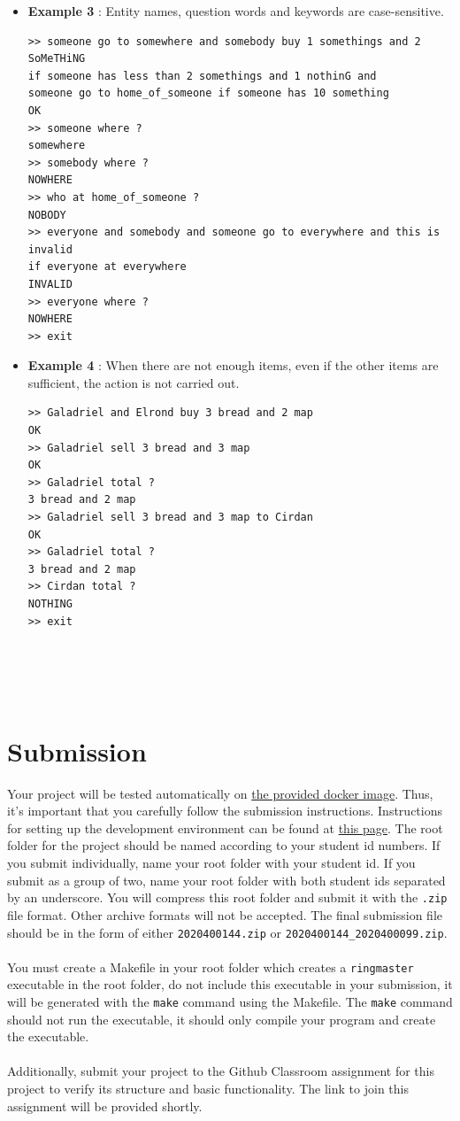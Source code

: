 \documentclass[12pt]{article}
\begin{document}
\begin{itemize}
\item \textbf{Example 3} : Entity names, question words and keywords are case-sensitive.{
\begin{verbatim}
>> someone go to somewhere and somebody buy 1 somethings and 2 SoMeTHiNG 
if someone has less than 2 somethings and 1 nothinG and 
someone go to home_of_someone if someone has 10 something
OK
>> someone where ?
somewhere
>> somebody where ?
NOWHERE
>> who at home_of_someone ?
NOBODY
>> everyone and somebody and someone go to everywhere and this is invalid 
if everyone at everywhere
INVALID
>> everyone where ?
NOWHERE
>> exit
\end{verbatim}}

\item \textbf{Example 4} : When there are not enough items, even if the other items are sufficient, the action is not carried out.{
\begin{verbatim}
>> Galadriel and Elrond buy 3 bread and 2 map
OK
>> Galadriel sell 3 bread and 3 map
OK
>> Galadriel total ?
3 bread and 2 map
>> Galadriel sell 3 bread and 3 map to Cirdan
OK
>> Galadriel total ?
3 bread and 2 map
>> Cirdan total ?
NOTHING
>> exit





\end{verbatim}}
\end{itemize}

\section{Submission}

Your project will be tested automatically on \href{https://hub.docker.com/repository/docker/gokceuludogan/cmpe230_spring24}{the provided docker image}. Thus, it's important that you carefully follow the submission instructions. Instructions for setting up the development environment can be found at \href{https://github.com/bouncmpe230/docker-starter-course/}{this page}. The root folder for the project should be named according to your student id numbers. If you submit individually, name your root folder with your student id. If you submit as a group of two, name your root folder with both student ids separated by an underscore. You will compress this root folder and submit it with the \texttt{.zip} file format. Other archive formats will not be accepted. The final submission file should be in the form of either \texttt{2020400144.zip} or \texttt{2020400144\_2020400099.zip}. 
\\\\
\noindent You must create a Makefile in your root folder which creates a \texttt{ringmaster} executable in the root folder, do not include this executable in your submission, it will be generated with the \texttt{make} command using the Makefile. The \texttt{make} command should not run the executable, it should only compile your program and create the executable. 
\\\\
\noindent Additionally, submit your project to the Github Classroom assignment for this project to verify its structure and basic functionality. The link to join this assignment will be provided shortly.
\end{document}
